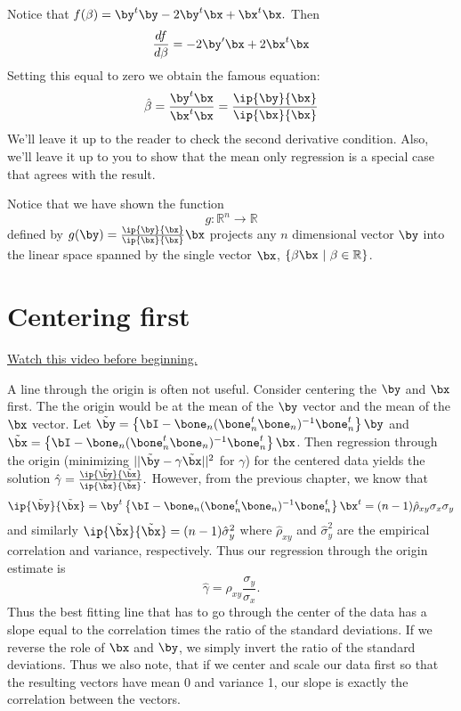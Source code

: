 Notice that
$
f(\beta) = \by^t \by - 2 \by^t \bx + \bx^t \bx.
$
Then 
$$
\frac{df}{d\beta} = -2\by'\bx  + 2 \bx^t \bx 
$$
Setting this equal to zero we obtain the famous equation:
$$
\hat \beta = \frac{\by^t \bx}{\bx^t \bx}
=\frac{\ip{\by}{\bx}}{\ip{\bx}{\bx}}
$$
We'll leave it up to the reader to check the second derivative 
condition. Also, we'll leave it up to you to show that the mean 
only regression is a  special case that agrees with the result.

Notice that we have shown the function
$$
g : \mathbb{R}^n \rightarrow \mathbb{R}
$$
defined by $g(\by) = \frac{\ip{\by}{\bx}}{\ip{\bx}{\bx}}\bx$ projects
any $n$ dimensional vector $\by$ into the linear space spanned
by the single vector $\bx$, $\{\beta \bx ~|~ \beta \in \mathbb{R}\}$.

\section{Centering first}

\href{https://www.youtube.com/watch?v=1ss_FYtiSHo&list=PLpl-gQkQivXhdgUCdaUQcdb31CRe8Mm2y&index=8}{Watch this video before beginning.}

A line through the origin is often not useful. Consider centering the
$\by$ and $\bx$ first. The the origin would be at the mean of the
$\by$ vector and the mean of the $\bx$ vector. Let
$\tilde \by = \left\{ \bI - \bone_n (\bone_n^t \bone_n)^{-1} \bone_n^t \right\} \by$ and $\tilde \bx = \left\{ \bI - \bone_n (\bone_n^t \bone_n)^{-1} \bone_n^t \right\} \bx$. Then regression through the origin (minimizing
$||\tilde \by - \gamma \tilde \bx||^2$ for $\gamma$)
for the centered data yields
the solution 
$
\hat \gamma = \frac{\ip{\tilde \by}{\tilde \bx}}{\ip{\tilde \bx}{\tilde \bx}}.
$
However, from the previous chapter, we know that
$$
\ip{\tilde \by}{\tilde \bx} = \by^t \left\{ \bI - \bone_n (\bone_n^t \bone_n)^{-1} \bone_n^t \right\} \bx^t
= (n-1)\hat{\rho}_{xy} \sigma_x \sigma_y
$$
and similarly $\ip{\tilde \bx}{\tilde \bx} = (n-1)\hat{\sigma}_y^2$
where $\hat \rho_{xy}$ and $\hat{\sigma}_y^2$ are the empirical correlation and
variance, respectively. Thus our regression through the origin estimate is
$$
\hat \gamma = \rho_{xy} \frac{\sigma_y}{\sigma_x}.
$$
Thus the best fitting line that has to go through the center of the data
has a slope equal to the correlation times the ratio of the standard deviations.
If we reverse the role of $\bx$ and $\by$, we simply invert the ratio of the
standard deviations. Thus we also note, that if we center and scale our
data first so that the resulting vectors have mean 0 and variance 1, our
slope is exactly the correlation between the vectors.

